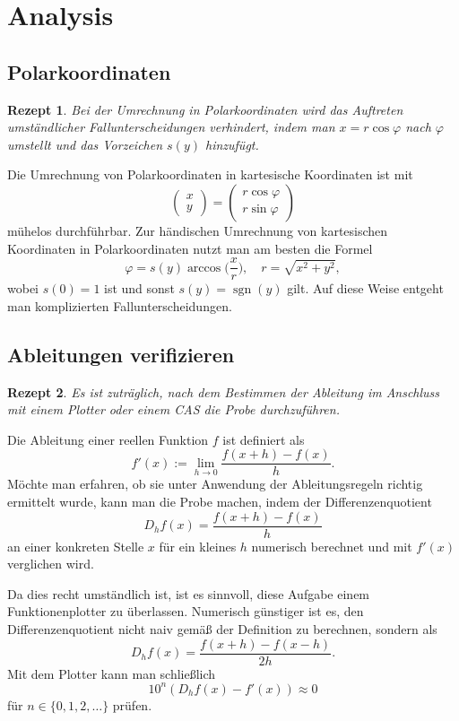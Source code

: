 \documentclass[a4paper,10pt,fleqn,twocolumn,twoside,dvipdfmx]{scrartcl}
\theoremstyle{rmbox}
\newtheorem{Rezept}{Rezept}[section]
\newcommand{\sgn}{\operatorname{sgn}}
\begin{document}
\newpage
\section{Analysis}

\subsection{Polarkoordinaten}

\begin{Rezept}
Bei der Umrechnung in Polarkoordinaten wird das Auftreten
umständlicher Fallunterscheidungen verhindert,
indem man $x=r\cos\varphi$ nach $\varphi$ umstellt
und das Vorzeichen $s(y)$ hinzufügt.
\end{Rezept}

\noindent
Die Umrechnung von Polarkoordinaten in kartesische Koordinaten
ist mit
\[\begin{pmatrix}x\\ y\end{pmatrix}
= \begin{pmatrix}r\cos\varphi\\ r\sin\varphi\end{pmatrix}\]
mühelos durchführbar. Zur händischen Umrechnung von kartesischen
Koordinaten in Polarkoordinaten nutzt man am besten die Formel
\[\varphi = s(y)\arccos\Big(\frac{x}{r}\Big),\quad r=\sqrt{x^2+y^2},\]
wobei $s(0)=1$ ist und sonst $s(y)=\sgn(y)$ gilt. Auf diese
Weise entgeht man komplizierten Fallunterscheidungen.

\subsection{Ableitungen verifizieren}

\begin{Rezept}
Es ist zuträglich, nach dem Bestimmen der Ableitung im Anschluss
mit einem Plotter oder einem CAS die Probe durchzuführen.
\end{Rezept}

\noindent
Die Ableitung einer reellen Funktion $f$ ist definiert als%
\[f'(x) := \lim_{h\to 0}\frac{f(x+h)-f(x)}{h}.\]
Möchte man erfahren, ob sie unter Anwendung
der Ableitungsregeln richtig ermittelt wurde, kann man die Probe
machen, indem der Differenzenquotient%
\[D_h f(x) = \frac{f(x+h)-f(x)}{h}\]
an einer konkreten Stelle $x$ für ein kleines $h$ numerisch
berechnet und mit $f'(x)$ verglichen wird.

Da dies recht umständlich ist, ist es sinnvoll, diese Aufgabe einem
Funktionenplotter zu überlassen. Numerisch günstiger ist es, den
Differenzenquotient nicht naiv gemäß der Definition zu berechnen,
sondern als%
\[D_h f(x) = \frac{f(x+h)-f(x-h)}{2h}.\]
Mit dem Plotter kann man schließlich
\[10^n (D_h f(x) - f'(x)) \approx 0\]
für $n\in\{0,1,2,\ldots\}$ prüfen.
\end{document}
